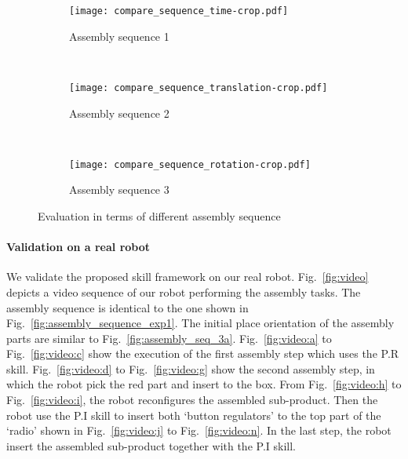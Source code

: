 \begin{figure}[!htbp]
\captionsetup[subfigure]{position=b}
    \centering
    \begin{subfigure}[t]{0.4\textwidth}
        \texttt{[image: compare\_sequence\_time-crop.pdf]}
        \caption{Assembly sequence 1}
        \label{fig:diff_initial_config1}
    \end{subfigure}
    ~
    \begin{subfigure}[t]{0.4\textwidth}
        \texttt{[image: compare\_sequence\_translation-crop.pdf]}
        \caption{Assembly sequence 2 }
        \label{fig:diff_initial_config2}
    \end{subfigure}
    ~
    \begin{subfigure}[t]{0.4\textwidth}
        \texttt{[image: compare\_sequence\_rotation-crop.pdf]}
        \caption{Assembly sequence 3 }
        \label{fig:diff_initial_config3}
    \end{subfigure}
    \caption{Evaluation in terms of different assembly sequence}\label{fig:diff_initial_config_moveit}
\end{figure} 

\paragraph{Validation on a real robot}
We validate the proposed skill framework on our real robot. Fig.~\ref{fig:video} depicts a video sequence of our robot performing the assembly tasks. The assembly sequence is identical to the one shown in Fig.~\ref{fig:assembly_sequence_exp1}. The initial place orientation of the assembly parts are similar to Fig.~\ref{fig:assembly_seq_3a}. Fig.~\ref{fig:video:a} to Fig.~\ref{fig:video:c} show the execution of the first assembly step which uses the P.R skill. Fig.~\ref{fig:video:d} to Fig.~\ref{fig:video:g} show the second assembly step, in which the robot pick the red part and insert to the box. From  Fig.~\ref{fig:video:h} to Fig.~\ref{fig:video:i}, the robot reconfigures the assembled sub-product. Then the robot use the P.I skill to insert both `button regulators' to the top part of the `radio' shown in Fig.~\ref{fig:video:j} to Fig.~\ref{fig:video:n}. In the last step, the robot insert the assembled sub-product together with the P.I skill. 


